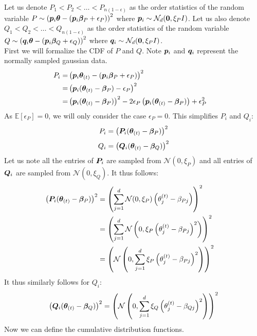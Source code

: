 \documentclass{article} %
\begin{document}
\begin{appendices}
	Let us denote $P_1 < P_2 < \dots < P_{n(1 - \epsilon)}$ as the order statistics of the random variable $P \sim \left({\bm{p}}_i {\bm{\theta}} - ({\bm{p}}_i {\bm{\beta}}_P + \epsilon_P)\right)^2$ where $ {\bm{p}}_i \sim \mathcal{N}_d({\bm{0}}, \xi_P I)$. Let us also denote $Q_1 < Q_2 < \dots < Q_{n(1 - \epsilon)}$ as the order statistics of the random variable $Q \sim \left({\bm{q}}_i {\bm{\theta}} - ({\bm{p}}_i {\bm{\beta}}_Q + \epsilon_Q)\right)^2$ where $ {\bm{q}}_i \sim \mathcal{N}_d({\bm{0}}, \xi_P I)$.\\
	First we will formalize the CDF of $P$ and $Q$. Note ${\bm{p}}_i$ and ${\bm{q}}_i$ represent the normally sampled gaussian data. 
	\begin{align}
		P_i = &\left({\bm{p}}_i{\bm{\theta}}_{(t)} - ({\bm{p}}_i {\bm{\beta}}_P + {\epsilon}_P)\right)^2 &&\\
		 = &\left({\bm{p}}_i({\bm{\theta}}_{(t)} - {\bm{\beta}}_P) - {\epsilon}_P\right)^2 &&\\
		= &\left({\bm{p}}_i({\bm{\theta}}_{(t)} - {\bm{\beta}}_P)\right)^2 - 2 {\epsilon}_P \left({\bm{p}}_i({\bm{\theta}}_{(t)} - {\bm{\beta}}_P)\right) + {\epsilon}_P^2 &&
	\end{align}
	As $\mathbb{E}\left[\epsilon_P\right] = 0$, we will only consider the case $\epsilon_P = 0$. This simplifies $P_i$ and $Q_i$:
	\begin{equation}
		P_i = \left({\bm{P}}_i({\bm{\theta}}_{(t)} - {\bm{\beta}}_P)\right)^2 
	\end{equation}
	\begin{equation}
		Q_i = \left({\bm{Q}}_i({\bm{\theta}}_{(t)} - {\bm{\beta}}_Q)\right)^2
	\end{equation}
	Let us note all the entries of ${\bm{P}}_i$ are sampled from $\mathcal{N}(0,\xi_P)$ and all entries of ${\bm{Q}}_i$ are sampled from $\mathcal{N}(0,\xi_Q)$.
	It thus follows:
	\begin{align*}
		\left({\bm{P}}_i({\bm{\theta}}_{(t)} - {\bm{\beta}}_P)\right)^2 &= \left(\sum_{j=1}^d\mathcal{N}(0,\xi_P)\left(\theta^{(t)}_j - \beta_{Pj}\right)\right)^2 &&\\
		&= \left(\sum_{j=1}^d \mathcal{N}\left(0,\xi_P\left(\theta_j^{(t)} - \beta_{Pj}\right)^2\right)\right)^2  &&\\
		&= \left(\mathcal{N}\left(0, \sum_{j=1}^d \xi_P\left(\theta_j^{(t)} - \beta_{Pj}\right)^2\right)\right)^2
	\end{align*}
	It thus similarly follows for $Q_i$:
	\begin{equation*}
		\left({\bm{Q}}_i({\bm{\theta}}_{(t)} - {\bm{\beta}}_Q)\right)^2 = \left(\mathcal{N}\left(0, \sum_{j=1}^d \xi_Q\left(\theta_j^{(t)} - \beta_{Qj}\right)^2\right)\right)^2
	\end{equation*}
	Now we can define the cumulative distribution functions.

\end{appendices}
\end{document}
